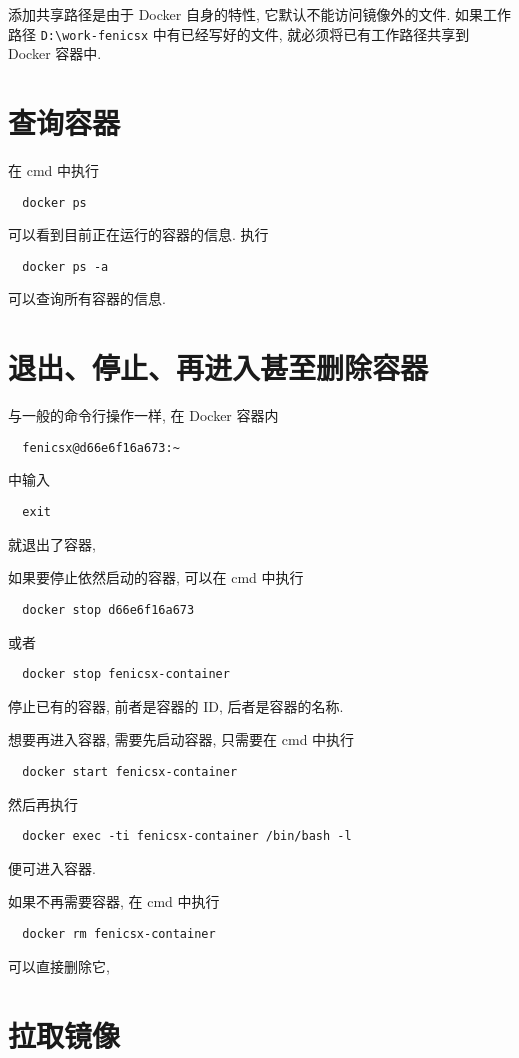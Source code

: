 \documentclass[fontset=founder]{ctexrep}
\begin{document}
添加共享路径是由于 Docker 自身的特性,
它默认不能访问镜像外的文件.
如果工作路径 \texttt{D:\textbackslash work-fenicsx} 中有已经写好的文件,
就必须将已有工作路径共享到 Docker 容器中.

\section{查询容器}

在 \textsf{cmd} 中执行
\begin{lstlisting}
  docker ps
\end{lstlisting}
可以看到目前正在运行的容器的信息.
执行
\begin{lstlisting}
  docker ps -a
\end{lstlisting}
可以查询所有容器的信息.

\section{退出、停止、再进入甚至删除容器}

与一般的命令行操作一样,
在 Docker 容器内
\begin{lstlisting}
  fenicsx@d66e6f16a673:~
\end{lstlisting}
中输入
\begin{lstlisting}
  exit
\end{lstlisting}
就退出了容器,

如果要停止依然启动的容器,
可以在 \textsf{cmd} 中执行
\begin{lstlisting}
  docker stop d66e6f16a673
\end{lstlisting}
或者
\begin{lstlisting}
  docker stop fenicsx-container
\end{lstlisting}
停止已有的容器,
前者是容器的 ID,
后者是容器的名称.

想要再进入容器,
需要先启动容器,
只需要在 \textsf{cmd} 中执行
\begin{lstlisting}
  docker start fenicsx-container
\end{lstlisting}
然后再执行
\begin{lstlisting}
  docker exec -ti fenicsx-container /bin/bash -l
\end{lstlisting}
便可进入容器.

如果不再需要容器,
在 \textsf{cmd} 中执行
\begin{lstlisting}
  docker rm fenicsx-container
\end{lstlisting}
可以直接删除它,

\section{拉取镜像}
\end{document}
